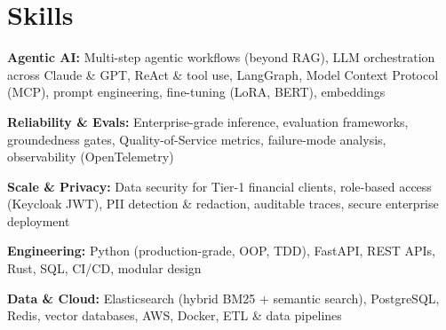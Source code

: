 \documentclass[10pt,a4paper]{article}
\begin{document}
\section{Skills}
\begin{tight}
  \item[\textcolor{accent}{\small$\bullet$}] \textbf{Agentic AI:} Multi-step agentic workflows (beyond RAG), LLM orchestration across Claude \& GPT, ReAct \& tool use, LangGraph, Model Context Protocol (MCP), prompt engineering, fine-tuning (LoRA, BERT), embeddings
  \item[\textcolor{accent}{\small$\bullet$}] \textbf{Reliability \& Evals:} Enterprise-grade inference, evaluation frameworks, groundedness gates, Quality-of-Service metrics, failure-mode analysis, observability (OpenTelemetry)
  \item[\textcolor{accent}{\small$\bullet$}] \textbf{Scale \& Privacy:} Data security for Tier-1 financial clients, role-based access (Keycloak JWT), PII detection \& redaction, auditable traces, secure enterprise deployment
  \item[\textcolor{accent}{\small$\bullet$}] \textbf{Engineering:} Python (production-grade, OOP, TDD), FastAPI, REST APIs, Rust, SQL, CI/CD, modular design
  \item[\textcolor{accent}{\small$\bullet$}] \textbf{Data \& Cloud:} Elasticsearch (hybrid BM25 + semantic search), PostgreSQL, Redis, vector databases, AWS, Docker, ETL \& data pipelines
\end{tight}

\end{document}
